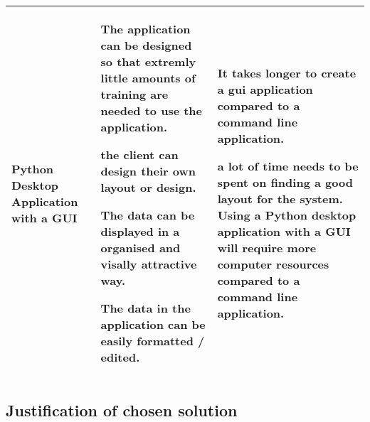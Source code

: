 \begin{center}
\begin{tabular}{|p{4cm}|p{4cm}|p{4cm}|}
     {Python Desktop Application with a GUI} & {The application can be designed so that extremly little amounts of training are needed to use the application.\par the client can design their own layout or design.\par The data can be displayed in a organised and visally attractive way.\par The data in the application can be easily formatted / edited.} & {It takes longer to create a gui application compared to a command line application.\par a lot of time needs to be spent on finding a good layout for the system. Using a Python desktop application with a GUI will require more computer resources compared to a command line application.} \\ \hline
\end{tabular}
\label{tab:range_examples}
\end{center}

\subsection{Justification of chosen solution}




